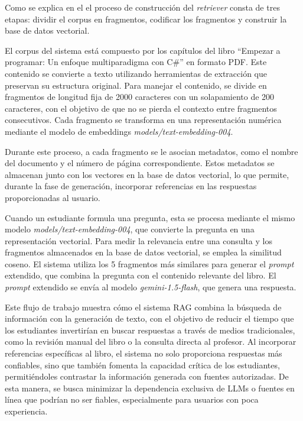 Como se explica en el  el proceso de construcción del \textit{retriever} consta de tres etapas: dividir el corpus en fragmentos, codificar los fragmentos y construir la base de datos vectorial.

El corpus del sistema está compuesto por los capítulos del libro ``Empezar a programar: Un enfoque multiparadigma con C\#'' en formato PDF. Este contenido se convierte a texto utilizando herramientas de extracción que preservan su estructura original. Para manejar el contenido, se divide en fragmentos de longitud fija de 2000 caracteres con un solapamiento de 200 caracteres, con el objetivo de que no se pierda el contexto entre fragmentos consecutivos. Cada fragmento se transforma en una representación numérica mediante el modelo de embeddings \textit{models/text-embedding-004}.

Durante este proceso, a cada fragmento se le asocian metadatos, como el nombre del documento y el número de página correspondiente. Estos metadatos se almacenan junto con los vectores en la base de datos vectorial, lo que permite, durante la fase de generación, incorporar referencias en las respuestas proporcionadas al usuario.

Cuando un estudiante formula una pregunta, esta se procesa mediante el mismo modelo \textit{models/text-embedding-004}, que convierte la pregunta en una representación vectorial. Para medir la relevancia entre una consulta y los fragmentos almacenados en la base de datos vectorial, se emplea la similitud coseno. El sistema utiliza los 5 fragmentos más similares para generar el \textit{prompt} extendido, que combina la pregunta con el contenido relevante del libro. El \textit{prompt} extendido se envía al modelo \textit{gemini-1.5-flash}, que genera una respuesta.

Este flujo de trabajo muestra cómo el sistema RAG combina la búsqueda de información con la generación de texto, con el objetivo de reducir el tiempo que los estudiantes invertirían en buscar respuestas a través de medios tradicionales, como la revisión manual del libro o la consulta directa al profesor. Al incorporar referencias específicas al libro, el sistema no solo proporciona respuestas más confiables, sino que también fomenta la capacidad crítica de los estudiantes, permitiéndoles contrastar la información generada con fuentes autorizadas. De esta manera, se busca minimizar la dependencia exclusiva de LLMs o fuentes en línea que podrían no ser fiables, especialmente para usuarios con poca experiencia.

